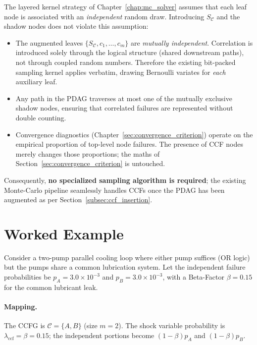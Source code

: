 The layered kernel strategy of Chapter~\ref{chap:mc_solver} assumes that each
leaf node is associated with an \emph{independent} random draw.  Introducing
$S_{\mathcal{C}}$ and the shadow nodes does not violate this assumption:
\begin{itemize}
  \item The augmented leaves \(\{S_{\mathcal{C}},c_1,\dots,c_m\}\) are   \emph{mutually independent}.  Correlation is introduced solely through the
        logical structure (shared downstream paths), not through coupled random
        numbers.  Therefore the existing bit-packed sampling kernel applies
        verbatim, drawing Bernoulli variates for \emph{each} auxiliary leaf.
  \item Any path in the PDAG traverses at most one of the mutually exclusive
        shadow nodes, ensuring that correlated failures are represented without
        double counting.
  \item Convergence diagnostics (Chapter~\ref{sec:convergence_criterion})
        operate on the empirical proportion of top-level node failures.  The
        presence of CCF nodes merely changes those proportions; the maths of
        Section~\ref{sec:convergence_criterion} is untouched.
\end{itemize}
Consequently, \textbf{no specialized sampling algorithm is required}; the
existing Monte-Carlo pipeline seamlessly handles CCFs once the PDAG has been
augmented as per Section~\ref{subsec:ccf_insertion}.

\section{Worked Example}
\label{sec:ccf_example}

Consider a two-pump parallel cooling loop where either pump suffices
(OR logic) but the pumps share a common lubrication system.  Let the independent
failure probabilities be \(p_A=3.0\times10^{-3}\) and \(p_B=3.0\times10^{-3}\),
with a Beta-Factor \(\beta=0.15\) for the common lubricant leak.

\paragraph{Mapping.}  The CCFG is \(\mathcal{C}=\{A,B\}\) (size $m=2$).  The
shock variable probability is $\lambda_{\text{ccf}}=\beta=0.15$; the
independent portions become $(1-\beta)p_A$ and $(1-\beta)p_B$.

